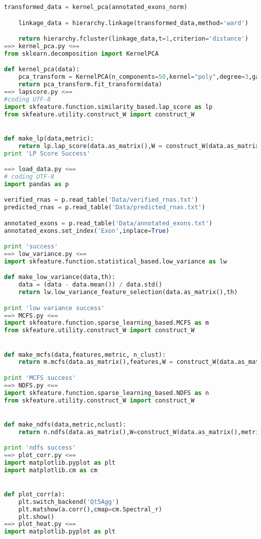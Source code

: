 \begin{lstlisting}[columns=fullflexible,language=Python]
    transformed_data = kernel_pca(annotated_exons_norm)

    linkage_data = hierarchy.linkage(transformed_data,method='ward')

    return hierarchy.fcluster(linkage_data,t=1,criterion='distance')
==> kernel_pca.py <==
from sklearn.decomposition import KernelPCA

def kernel_pca(data):
    pca_transform = KernelPCA(n_components=50,kernel="poly",degree=3,gamma = 1e-3)
    return pca_transform.fit_transform(data)
==> lapscore.py <==
#coding UTF-8
import skfeature.function.similarity_based.lap_score as lp
from skfeature.utility.construct_W import construct_W


def make_lp(data,metric):
    return lp.lap_score(data.as_matrix(),W = construct_W(data.as_matrix(),metric=metric))
print 'LP Score Success'

==> load_data.py <==
# coding UTF-8
import pandas as p

verified_rnas = p.read_table('Data/verified_rnas.txt')
predicted_rnas = p.read_table('Data/predicted_rnas.txt')

annotated_exons = p.read_table('Data/annotated_exons.txt')
annotated_exons.set_index('Exon',inplace=True)

print 'success'
==> low_variance.py <==
import skfeature.function.statistical_based.low_variance as lw

def make_low_variance(data,th):
    data = (data - data.mean()) / data.std()
    return lw.low_variance_feature_selection(data.as_matrix(),th)

print 'low variance success'
==> MCFS.py <==
import skfeature.function.sparse_learning_based.MCFS as m
from skfeature.utility.construct_W import construct_W


def make_mcfs(data,features,metric, n_clust):
    return m.mcfs(data.as_matrix(),features,W = construct_W(data.as_matrix(),metric=metric),n_clusters=n_clust)

print 'MCFS success'
==> NDFS.py <==
import skfeature.function.sparse_learning_based.NDFS as n
from skfeature.utility.construct_W import construct_W


def make_ndfs(data,metric,nclust):
    return n.ndfs(data.as_matrix(),W=construct_W(data.as_matrix(),metric=metric),n_clusters=nclust)

print 'ndfs success'
==> plot_corr.py <==
import matplotlib.pyplot as plt
import matplotlib.cm as cm


def plot_corr(a):
    plt.switch_backend('Qt5Agg')
    plt.matshow(a.corr(),cmap=cm.Spectral_r)
    plt.show()
==> plot_heat.py <==
import matplotlib.pyplot as plt


\end{lstlisting}

